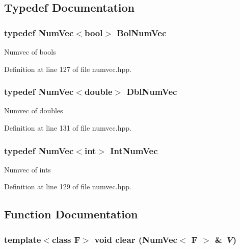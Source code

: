 \subsection{Typedef Documentation}
\subsubsection{\setlength{\rightskip}{0pt plus 5cm}typedef {\bf Num\-Vec}$<$bool$>$ {\bf Bol\-Num\-Vec}}\label{numvec_8hpp_e7b334ad2709d68109d453b8e618c9cd_e7b334ad2709d68109d453b8e618c9cd}


Numvec of bools 

Definition at line 127 of file numvec.hpp.
\subsubsection{\setlength{\rightskip}{0pt plus 5cm}typedef {\bf Num\-Vec}$<$double$>$ {\bf Dbl\-Num\-Vec}}\label{numvec_8hpp_440ba0a3cc36d52c2c5f9b540bed8ac5_440ba0a3cc36d52c2c5f9b540bed8ac5}


Numvec of doubles 

Definition at line 131 of file numvec.hpp.
\subsubsection{\setlength{\rightskip}{0pt plus 5cm}typedef {\bf Num\-Vec}$<$int$>$ {\bf Int\-Num\-Vec}}\label{numvec_8hpp_d02385ca3d87c7e12eab3349354f41ef_d02385ca3d87c7e12eab3349354f41ef}


Numvec of ints 

Definition at line 129 of file numvec.hpp.

\subsection{Function Documentation}
\subsubsection{\setlength{\rightskip}{0pt plus 5cm}template$<$class F$>$ void clear ({\bf Num\-Vec}$<$ F $>$ \& {\em V})\hspace{0.3cm}{\tt  [inline]}}\label{numvec_8hpp_e9a0f533123ffe65bbb091dd24094958_e9a0f533123ffe65bbb091dd24094958}


